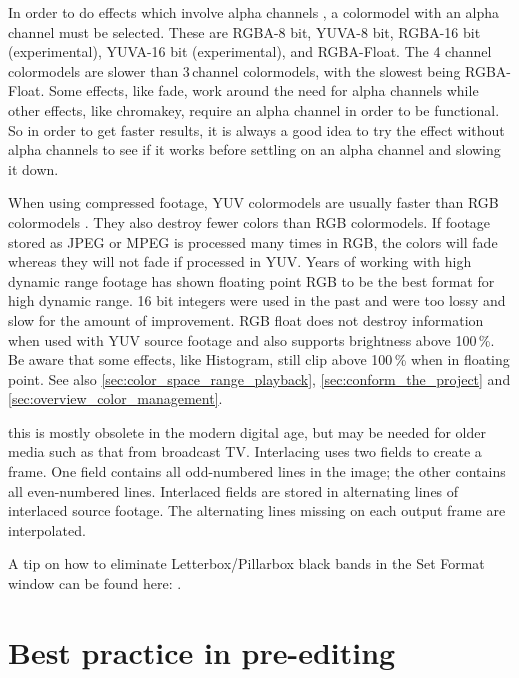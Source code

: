 \begin{description}
In order to do effects which involve alpha
channels , a colormodel with an alpha channel must be selected.
These are RGBA-8 bit, YUVA-8 bit, RGBA-16 bit (experimental), YUVA-16 bit (experimental), and RGBA-Float. The 4 channel
colormodels are slower than 3\,channel colormodels, with the slowest
being RGBA-Float.  Some effects, like fade, work around the need for
alpha channels while other effects, like chromakey, require an alpha
channel in order to be functional.  So in order to get faster
results, it is always a good idea to try the effect without alpha
channels to see if it works before settling on an alpha channel and
slowing it down.

  When using compressed footage, YUV colormodels  are usually faster
than RGB colormodels .  They also destroy fewer colors than RGB
colormodels.  If footage stored as JPEG or MPEG is processed many
times in RGB, the colors will fade whereas they will not fade if
processed in YUV\@.  Years of working with high dynamic range footage
has shown floating point RGB to be the best format for high dynamic
range.  16 bit integers were used in the past and were too lossy and
slow for the amount of improvement.  RGB float does not destroy
information when used with YUV source footage and also supports
brightness above 100\,\%.  Be aware that some effects, like
Histogram, still clip above 100\,\% when in floating point. See also \ref{sec:color_space_range_playback}, \ref{sec:conform_the_project} and \ref{sec:overview_color_management}.

\item[Interlace mode:]  this is mostly obsolete in the modern digital
age, but may be needed for older media such as that from broadcast
TV\@.  Interlacing uses two fields to create a frame. One field
contains all odd-numbered lines in the image; the other contains all
even-numbered lines.  Interlaced fields are stored in alternating
lines of interlaced source footage. The alternating lines missing on
each output frame are interpolated.
\end{description}
A tip on how to eliminate Letterbox/Pillarbox black bands in the Set
Format window can be found here: .

\section{Best practice in pre-editing}%
\label{sec:best_practice_pre_editing}

